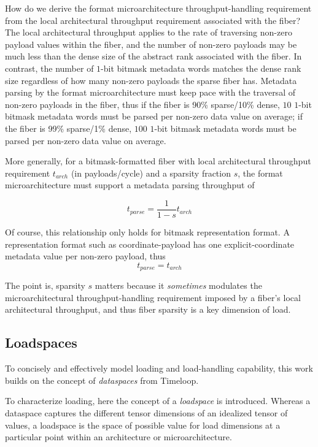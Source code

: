 \begin{itemize}
    How do we derive the format microarchitecture throughput-handling requirement from the local architectural throughput requirement associated with the fiber? The local architectural throughput applies to the rate of traversing non-zero payload values within the fiber, and the number of non-zero payloads may be much less than the dense size of the abstract rank associated with the fiber. In contrast, the number of $1$-bit bitmask metadata words matches the dense rank size regardless of how many non-zero payloads the sparse fiber has. Metadata parsing by the format microarchitecture must keep pace with the traversal of non-zero payloads in the fiber, thus if the fiber is 90\% sparse/10\% dense, $10$ $1$-bit bitmask metadata words must be parsed per non-zero data value on average; if the fiber is 99\% sparse/1\% dense, $100$ $1$-bit bitmask metadata words must be parsed per non-zero data value on average.

    More generally, for a bitmask-formatted fiber with local architectural throughput requirement $t_{arch}$ (in payloads/cycle) and a sparsity fraction $s$, the format microarchitecture must support a metadata parsing throughput of

    \[t_{parse} = \frac{1}{1-s}t_{arch}\]

    Of course, this relationship only holds for bitmask representation format. A representation format such as coordinate-payload has one explicit-coordinate metadata value per non-zero payload, thus \[t_{parse} = t_{arch}\]

    The point is, sparsity $s$ matters because it \textit{sometimes} modulates the microarchitectural throughput-handling requirement imposed by a fiber's local architectural throughput, and thus fiber sparsity is a key dimension of load.

\subsection{Loadspaces}
\label{sec:loadspaces}

To concisely and effectively model loading and load-handling capability, this work builds on the concept of \textit{dataspaces} from Timeloop\cite{timeloop}.

To characterize loading, here the concept of a \textit{loadspace} is introduced. Whereas a dataspace captures the different tensor dimensions of an idealized tensor of values, a loadspace is the space of possible value for load dimensions at a particular point within an architecture or microarchitecture.


\end{itemize}
